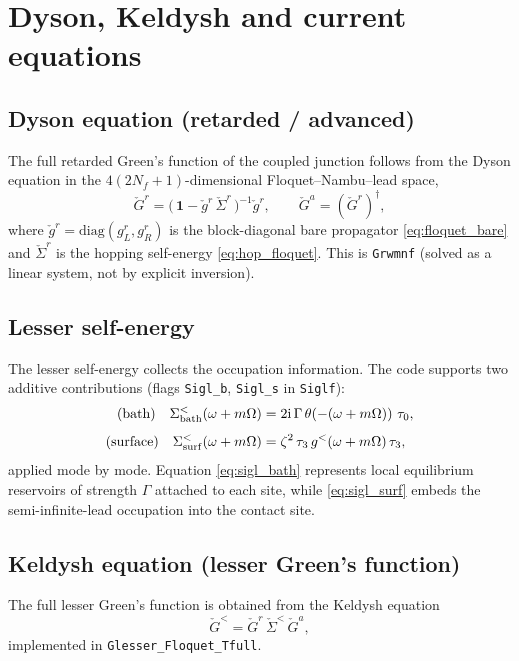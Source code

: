 \documentclass[11pt,a4paper]{article}
\newcommand{\id}{\mathbf{1}}          %
\newcommand{\ii}{\mathrm{i}}
\newcommand{\gr}{\check{g}}            %
\newcommand{\Gr}{\check{G}}            %
\newcommand{\Sig}{\check{\Sigma}}      %
\newcommand{\tauz}{\tau_3}
\newcommand{\Om}{\Omega}
\begin{document}
\section{Dyson, Keldysh and current equations}
\label{sec:dyson}

\subsection{Dyson equation (retarded / advanced)}

The full retarded Green's function of the coupled junction follows from the
Dyson equation in the $4(2N_f+1)$-dimensional Floquet--Nambu--lead space,
\begin{equation}
  \Gr^r = \bigl(\,\id - \gr^r\,\Sig^r\,\bigr)^{-1}\gr^r,
  \qquad
  \Gr^a = (\Gr^r)^\dagger,
  \label{eq:dyson}
\end{equation}
where $\gr^r=\mathrm{diag}(g^r_L,g^r_R)$ is the block-diagonal bare propagator
\eqref{eq:floquet_bare} and $\Sig^r$ is the hopping self-energy
\eqref{eq:hop_floquet}.  This is \texttt{Grwmnf} (solved as a linear system,
not by explicit inversion).

\subsection{Lesser self-energy}
\label{sec:lesser_se}

The lesser self-energy collects the occupation information.  The code supports
two additive contributions (flags \texttt{Sigl\_b}, \texttt{Sigl\_s} in
\texttt{Siglf}):
\begin{align}
  \text{(bath)}\quad
  \Sigma^<_{\rm bath}(\omega+m\Om)
    &= 2\ii\,\Gamma\,\theta\!\left(-(\omega+m\Om)\right)\,\tau_0,
  \label{eq:sigl_bath}\\[4pt]
  \text{(surface)}\quad
  \Sigma^<_{\rm surf}(\omega+m\Om)
    &= \zeta^2\,\tauz\, g^<(\omega+m\Om)\,\tauz,
  \label{eq:sigl_surf}
\end{align}
applied mode by mode.  Equation \eqref{eq:sigl_bath} represents local
equilibrium reservoirs of strength $\Gamma$ attached to each site, while
\eqref{eq:sigl_surf} embeds the semi-infinite-lead occupation into the contact
site.

\subsection{Keldysh equation (lesser Green's function)}

The full lesser Green's function is obtained from the Keldysh equation
\begin{equation}
  \Gr^< = \Gr^r\,\Sig^<\,\Gr^a,
  \label{eq:keldysh}
\end{equation}
implemented in \texttt{Glesser\_Floquet\_Tfull}.
\end{document}
